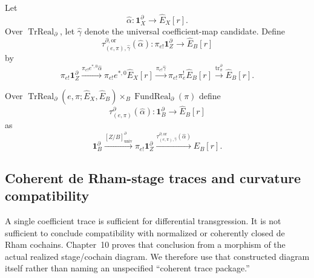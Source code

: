 \begin{construction}
\label{constr:prequantum-orientation-free-differential-transgression}
Let
\[
\widehat\alpha:
\mathbf1_X^{\partial}\longrightarrow\widehat E_X[r].
\]
Over $\operatorname{TrReal}_{\partial}$, let $\widehat\gamma$ denote the universal
coefficient-map candidate.  Define
\[
\boxed{
\tau^{\partial,\mathrm{or}}_{(e,\pi),\widehat\gamma}
(\widehat\alpha):
\pi_{e!}\mathbf1_Z^{\partial}
\longrightarrow
\widehat E_B[r]
}
\]
by
\[
\pi_{e!}\mathbf1_Z^{\partial}
\xrightarrow{\pi_{e!} e^{*,0}\widehat\alpha}
\pi_{e!}e^{*,0}\widehat E_X[r]
\xrightarrow{\pi_{e!}\widehat\gamma}
\pi_{e!}\pi_e^!\widehat E_B[r]
\xrightarrow{\operatorname{tr}^{\partial}_\pi}
\widehat E_B[r].
\]
\end{construction}

\begin{construction}
\label{constr:prequantum-differential-transgression}
Over
$\operatorname{TrReal}_{\partial}(e,\pi;\widehat E_X,\widehat E_B)
\times_B\operatorname{FundReal}_{\partial}(\pi)$ define
\[
\boxed{
\tau^{\partial}_{(e,\pi)}(\widehat\alpha):
\mathbf1_B^{\partial}
\longrightarrow
\widehat E_B[r]
}
\]
as
\[
\mathbf1_B^{\partial}
\xrightarrow{[Z/B]^\partial_{\mathrm{univ}}}
\pi_{e!}\mathbf1_Z^{\partial}
\xrightarrow{\tau^{\partial,\mathrm{or}}_{(e,\pi),\widehat\gamma}
(\widehat\alpha)}
\widehat E_B[r].
\]
\end{construction}

\subsection{Coherent de Rham-stage traces and curvature compatibility}
\label{subsec:prequantum-curvature-compatible-trace-realization}

A single coefficient trace is sufficient for differential transgression.  It is
not sufficient to conclude compatibility with normalized or coherently closed de
Rham cochains.  Chapter~10 proves that conclusion from a morphism of the actual
realized stage/cochain diagram.  We therefore use that constructed diagram
itself rather than naming an unspecified ``coherent trace package.''

